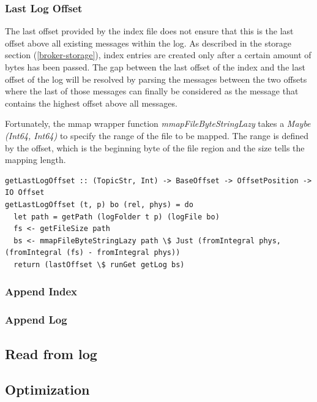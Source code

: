 
\subsubsection{Last Log Offset}

The last offset provided by the index file does not ensure that this is the
last offset above all existing messages within the log. As described in the
storage section (\ref{broker-storage}), index entries are created only after a
certain amount of bytes has been passed. The gap between the last offset of the
index and the last offset of the log will be resolved by parsing the messages
between the two offsets where the last of those messages can finally be
considered as the message that contains the highest offset above all messages. 

Fortunately, the mmap wrapper function \textit{mmapFileByteStringLazy} takes a
\textit{Maybe (Int64, Int64)} to specify the range of the file to be mapped.
The range is defined by the offset, which is the beginning byte of the file
region and the size tells the mapping length.

\begin{lstlisting}
getLastLogOffset :: (TopicStr, Int) -> BaseOffset -> OffsetPosition -> IO Offset
getLastLogOffset (t, p) bo (rel, phys) = do
  let path = getPath (logFolder t p) (logFile bo)
  fs <- getFileSize path
  bs <- mmapFileByteStringLazy path \$ Just (fromIntegral phys, (fromIntegral (fs) - fromIntegral phys))
  return (lastOffset \$ runGet getLog bs)
\end{lstlisting}

\subsubsection{Append Index}

\subsubsection{Append Log}


\subsection{Read from log}

\subsection{Optimization}

